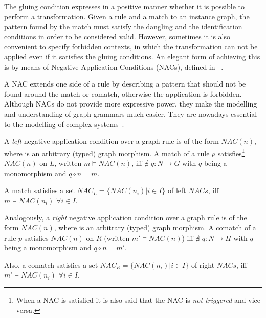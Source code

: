 The gluing condition expresses in a positive manner whether it is possible to perform a transformation. Given a rule and a match to an instance graph, the pattern found by the match must satisfy the dangling and the identification conditions in order to be considered valid. However, sometimes it is also convenient to specify forbidden contexts, in which the transformation can not be applied even if it satisfies the gluing conditions. An elegant form of
achieving this is by means of Negative Application Conditions (NACs), defined in ~\cite{Habel1996}.

A NAC extends one side of a rule by describing a pattern that should not be found around the match or comatch, otherwise the application is forbidden. Although NACs do not provide more expressive power, they make the modelling and understanding of graph grammars much easier. They are nowadays essential to the modelling of complex systems~\cite{Corradini2014}.

\begin{definition} A \emph{left} negative application condition over a graph rule \graphrule{} is of the form $NAC\left(n\right)$, where \nac{} is an arbitrary (typed) graph morphism. A match \match{} of a rule $p$ satisfies\footnote{When a NAC is satisfied it is also said that the NAC is \emph{not triggered} and vice versa.} $NAC\left(n\right)$ on $L$, written $m \models NAC\left(n\right)$, iff $\nexists$ $q : N \rightarrow G$ with $q$ being a monomorphism and $q \circ n = m$.


  A match \match{} satisfies a set \mbox{$NAC_L = \{NAC\left(n_i\right)|i \in I\}$} of left $NACs$, iff \mbox{$m \models NAC\left(n_i\right)$} $\forall i \in I$.

  Analogously, a \emph{right} negative application condition over a graph rule \graphrule{} is of the form $NAC\left(n\right)$, where \rightnac{} is an arbitrary (typed) graph morphism. A comatch \comatch{} of a rule $p$ satisfies $NAC\left(n\right)$ on $R$ (written \mbox{$m' \models NAC\left(n\right)$}) iff $\nexists$ $q : N \rightarrow H$ with $q$ being a monomorphism and $q \circ n = m'$.

  Also, a comatch \comatch{} satisfies a set \mbox{$NAC_R = \{NAC\left(n_i\right)|i \in I\}$} of right $NACs$, iff $m' \models NAC\left(n_i\right)$ $\forall i \in I$.

\end{definition}

